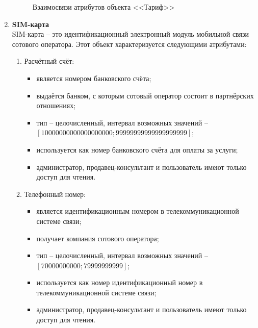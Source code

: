 \begin{enumerate}
    \begin{figure}[H]
        \label{fig:tariff-objects}
        \caption{Взаимосвязи атрибутов объекта <<Тариф>>}
    \end{figure}

    \item \textbf{SIM-карта} \\
    SIM-карта -- это идентификационный электронный модуль мобильной связи сотового оператора. Этот объект характеризуется следующими атрибутами:
    \begin{enumerate}
        \item Расчётный счёт:
        \begin{itemize}
            \item является номером банковского счёта;
            \item выдаётся банком, с которым сотовый оператор состоит в партнёрских отношениях;
            \item тип -- целочисленный, интервал возможных значений -- $[10000000000000000000; 99999999999999999999]$;
            \item используется как номер банковского счёта для оплаты за услуги;
            \item администратор, продавец-консультант и пользователь имеют только доступ для чтения.
        \end{itemize}

        \item Телефонный номер:
        \begin{itemize}
            \item является идентификационным номером в телекоммуникационной системе связи;
            \item получает компания сотового оператора;
            \item тип -- целочисленный, интервал возможных значений -- $[70000000000; 79999999999]$;
            \item используется как номер идентификационный номер в телекоммуникационной системе связи;
            \item администратор, продавец-консультант и пользователь имеют только доступ для чтения.
        \end{itemize}


\end{enumerate}
\end{enumerate}
